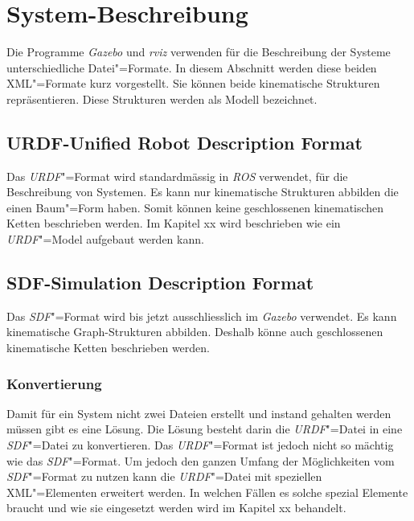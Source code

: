\section{System-Beschreibung}

Die Programme \textit{Gazebo} und \textit{rviz} verwenden für die Beschreibung der Systeme unterschiedliche Datei"=Formate.
In diesem Abschnitt werden diese beiden XML"=Formate kurz vorgestellt.
Sie können beide kinematische Strukturen repräsentieren.
Diese Strukturen werden als Modell bezeichnet.

\subsection{URDF-Unified Robot Description Format}
Das \textit{URDF}"=Format wird standardmässig in \textit{ROS} verwendet, für die Beschreibung von Systemen.
Es kann nur kinematische Strukturen abbilden die einen Baum"=Form haben.
Somit können keine geschlossenen kinematischen Ketten beschrieben werden.
Im Kapitel xx wird beschrieben wie ein \textit{URDF}"=Model aufgebaut werden kann. %

\subsection{SDF-Simulation Description Format}
Das \textit{SDF}"=Format wird bis jetzt ausschliesslich im \textit{Gazebo} verwendet.
Es kann kinematische Graph-Strukturen abbilden.
Deshalb könne auch geschlossenen kinematische Ketten beschrieben werden.

\subsubsection{Konvertierung}
Damit für ein System nicht zwei Dateien erstellt und instand gehalten werden müssen gibt es eine Lösung.
Die Lösung besteht darin die \textit{URDF}"=Datei in eine \textit{SDF}"=Datei zu konvertieren.
Das \textit{URDF}"=Format ist jedoch nicht so mächtig wie das \textit{SDF}"=Format.
Um jedoch den ganzen Umfang der Möglichkeiten vom \textit{SDF}"=Format zu nutzen kann die \textit{URDF}"=Datei mit speziellen XML"=Elementen erweitert werden.
In welchen Fällen es solche spezial Elemente braucht und wie sie eingesetzt werden wird im Kapitel xx behandelt. %


